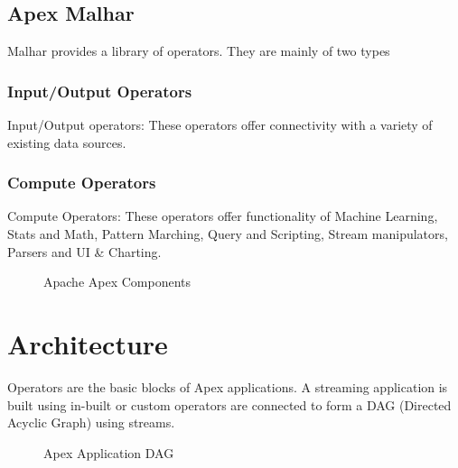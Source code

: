 \documentclass[9pt,twocolumn,twoside]{../../styles/osajnl}
\begin{document}
\subsection{Apex Malhar}
Malhar provides a library of operators. They are mainly of two types
\subsubsection{Input/Output Operators}
Input/Output operators: These operators offer connectivity with a variety of existing data sources.
\subsubsection{Compute Operators}
Compute Operators: These operators offer functionality of Machine Learning, Stats and Math, Pattern Marching, Query and Scripting, Stream manipulators, Parsers and UI \& Charting.
\begin{figure}[ht!]
\centering
{}
\caption{Apache Apex Components \cite{www-apacheapexblog}}
\label{fig:Apache Apex Components}
\end{figure}




\section{Architecture}

Operators are the basic blocks of Apex applications. A streaming application is built using in-built or custom operators are connected to form a DAG (Directed Acyclic Graph) using streams. 
\begin{figure}[ht!]
\centering
{}
\caption{Apex Application DAG \cite{www-apacheapexappdevdoc}}
\label{fig:Apex Application DAG}
\end{figure}
\end{document}
